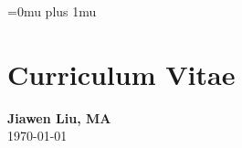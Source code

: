 \documentclass[12pt, letterpaper]{report}   %
\begin{document}
% 



\newpage
\singlespace
\Urlmuskip=0mu plus 1mu\relax %




\chapter*{Curriculum Vitae}
\begin{large}
\begin{center}
\textbf{Jiawen Liu, MA}\\ 
\today\\
\end{center}
\end{large}
\end{document}
